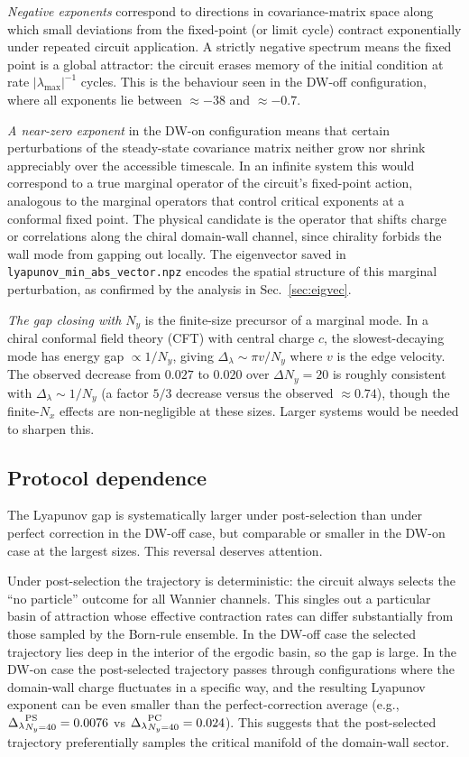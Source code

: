 \documentclass[aps,twocolumn,floatfix,superscriptaddress,nofootinbib]{revtex4-2}
\newcommand{\lam}{\lambda}
\newcommand{\Dlam}{{\Delta_{\lambda}}}
\begin{document}
\emph{Negative exponents} correspond to directions in covariance-matrix space
along which small deviations from the fixed-point (or limit cycle) contract
exponentially under repeated circuit application.  A strictly negative spectrum
means the fixed point is a global attractor: the circuit erases memory of the
initial condition at rate $|\lam_{\max}|^{-1}$ cycles.  This is the behaviour
seen in the DW-off configuration, where all exponents lie between
$\approx -38$ and $\approx -0.7$.

\emph{A near-zero exponent} in the DW-on configuration means that certain
perturbations of the steady-state covariance matrix neither grow nor shrink
appreciably over the accessible timescale.  In an infinite system this would
correspond to a true marginal operator of the circuit's fixed-point action,
analogous to the marginal operators that control critical exponents at a
conformal fixed point.  The physical candidate is the operator that shifts
charge or correlations along the chiral domain-wall channel, since chirality
forbids the wall mode from gapping out locally.  The eigenvector saved in
\texttt{lyapunov\_min\_abs\_vector.npz} encodes the spatial structure of this
marginal perturbation, as confirmed by the analysis in Sec.~\ref{sec:eigvec}.

\emph{The gap closing with $N_y$} is the finite-size precursor of a marginal
mode.  In a chiral conformal field theory (CFT) with central charge $c$, the
slowest-decaying mode has energy gap $\propto 1/N_y$, giving $\Dlam\sim
\pi v/N_y$ where $v$ is the edge velocity.  The observed decrease from $0.027$
to $0.020$ over $\Delta N_y=20$ is roughly consistent with $\Dlam\sim 1/N_y$
(a factor $5/3$ decrease versus the observed $\approx 0.74$), though the
finite-$N_x$ effects are non-negligible at these sizes.  Larger systems would
be needed to sharpen this.

\subsection{Protocol dependence}
\label{sec:protocol}

The Lyapunov gap is systematically larger under post-selection than under
perfect correction in the DW-off case, but comparable or smaller in the DW-on
case at the largest sizes.  This reversal deserves attention.

Under post-selection the trajectory is deterministic: the circuit always selects
the ``no particle'' outcome for all Wannier channels.  This singles out a
particular basin of attraction whose effective contraction rates can differ
substantially from those sampled by the Born-rule ensemble.  In the DW-off case
the selected trajectory lies deep in the interior of the ergodic basin, so the
gap is large.  In the DW-on case the post-selected trajectory passes through
configurations where the domain-wall charge fluctuates in a specific way, and
the resulting Lyapunov exponent can be even smaller than the perfect-correction
average (e.g., $\Dlam^{\rm PS}_{N_y=40}=0.0076$ vs $\Dlam^{\rm PC}_{N_y=40}=0.024$).
This suggests that the post-selected trajectory preferentially samples the
critical manifold of the domain-wall sector.
\end{document}
